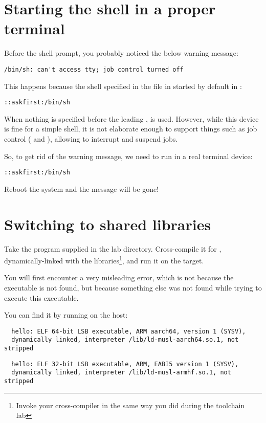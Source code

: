 \section{Starting the shell in a proper terminal}

Before the shell prompt, you probably noticed the below warning message:

\begin{verbatim}
/bin/sh: can't access tty; job control turned off
\end{verbatim}

This happens because the shell specified in the  file
in started by default in :

\begin{verbatim}
::askfirst:/bin/sh
\end{verbatim}

When nothing is specified before the leading \code{::}, 
is used. However, while this device is fine for a simple shell, it is
not elaborate enough to support things such as job control
(\code{[Ctrl][c]} and \code{[Ctrl][z]}), allowing to interrupt and
suspend jobs.

So, to get rid of the warning message, we need  to run
 in a real terminal device:

{\tt \ttyname::askfirst:/bin/sh}

Reboot the system and the message will be gone!

\section{Switching to shared libraries}

Take the  program supplied in the lab 
directory. Cross-compile it for ,
dynamically-linked with the libraries\footnote{Invoke your cross-compiler
in the same way you did during the toolchain lab}, and run it on the target.

You will first encounter a very misleading  error,
which is not because the  executable is not found, but
because something else was not found while trying to execute
this executable.

You can find it by running  on the host:

\if{}
\begin{verbatim}
  hello: ELF 64-bit LSB executable, ARM aarch64, version 1 (SYSV),
  dynamically linked, interpreter /lib/ld-musl-aarch64.so.1, not stripped
\end{verbatim}
\else
\begin{verbatim}
  hello: ELF 32-bit LSB executable, ARM, EABI5 version 1 (SYSV),
  dynamically linked, interpreter /lib/ld-musl-armhf.so.1, not stripped
\end{verbatim}
\fi

